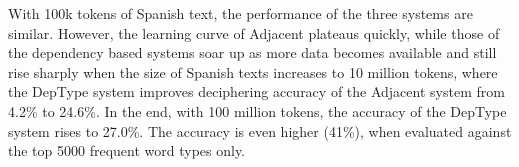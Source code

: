 With 100k tokens of Spanish text, the performance of the three systems are similar. However, the learning curve of Adjacent plateaus quickly, while those of the dependency based systems soar up as more data becomes available and still rise sharply when the size of Spanish texts increases to 10 million tokens, where the DepType system improves deciphering accuracy of the Adjacent system from 4.2\% to 24.6\%. In the end, with 100 million tokens, the accuracy of the DepType system rises to 27.0\%. The accuracy is even higher (41\%), when evaluated against the top 5000 frequent word types only.




